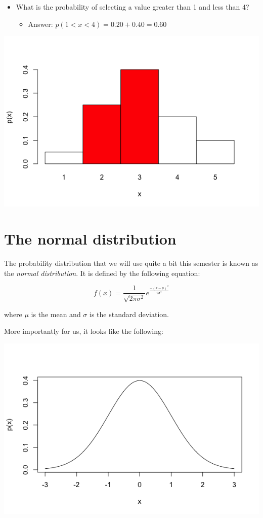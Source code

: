 \documentclass[11pt]{article}
\begin{document}
\begin{itemize}
\item What is the probability of selecting a value greater than 1 and less than 4?
\begin{itemize}
\item Answer: $p(1 < x < 4) = 0.20 + 0.40 = 0.60$
\end{itemize}
\end{itemize}

\includegraphics[width=.9\linewidth]{figures/week5/plot4.png}  

\section*{The normal distribution}
\label{sec-3}

The probability distribution that we will use quite a bit this semester is known as the \emph{normal distribution}.  It is defined by the following equation:

\[
f(x) = \frac{1}{\sqrt{2\pi\sigma^2}}e^{\frac{-(x-\mu)^2}{2\sigma^2}}
\]

where $\mu$ is the mean and $\sigma$ is the standard deviation.

More importantly for us, it looks like the following:

\includegraphics[width=.9\linewidth]{figures/week5/normal.png}
\end{document}
